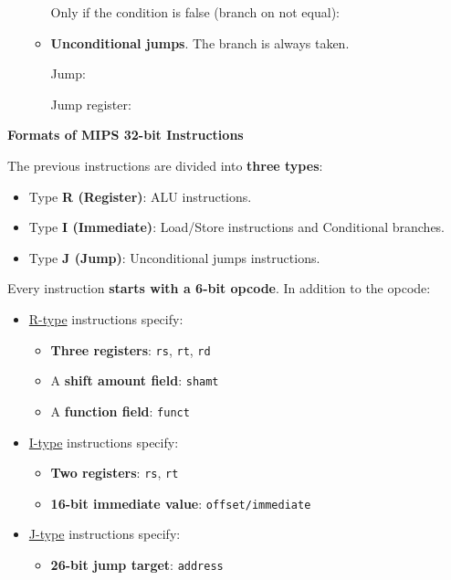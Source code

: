\documentclass[a4paper]{article}
\begin{document}
\begin{itemize}
\begin{itemize}
            Only if the condition is false (branch on not equal):
            


            \item \textbf{Unconditional jumps}. The branch is always taken.

            Jump:
            

            Jump register:
            
        \end{itemize}
    \end{itemize}

    \newpage

    \begin{center}
        \large
        \textcolor{Red3}{\textbf{Formats of MIPS 32-bit Instructions}}
    \end{center}
    The previous instructions are divided into \textbf{three types}: 
    \begin{itemize}
        \item Type \textbf{R (Register)}: ALU instructions.

        \item Type \textbf{I (Immediate)}: Load/Store instructions and Conditional branches.
        
        \item Type \textbf{J (Jump)}: Unconditional jumps instructions.
    \end{itemize}
    Every instruction \textbf{starts with a 6-bit opcode}. In addition to the opcode:
    \begin{itemize}
        \item \underline{R-type} instructions specify:
        \begin{itemize}
            \item \textbf{Three registers}: \texttt{rs}, \texttt{rt}, \texttt{rd}
            \item A \textbf{shift amount field}: \texttt{shamt}
            \item A \textbf{function field}: \texttt{funct}
        \end{itemize}

        \item \underline{I-type} instructions specify:
        \begin{itemize}
            \item \textbf{Two registers}: \texttt{rs}, \texttt{rt}
            \item \textbf{16-bit immediate value}: \texttt{offset/immediate}
        \end{itemize}

        \item \underline{J-type} instructions specify: 
        \begin{itemize}
            \item \textbf{26-bit jump target}: \texttt{address}
        \end{itemize}
    \end{itemize}
\end{document}
